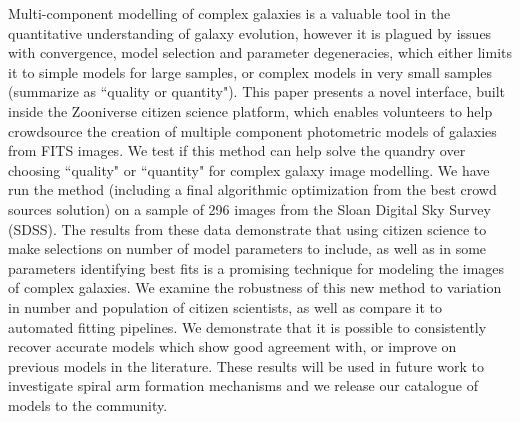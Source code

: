 \documentclass[../main.tex]{subfiles}
\begin{document}
Multi-component modelling of complex galaxies is a valuable tool in the quantitative understanding of galaxy evolution, however it is plagued by issues with convergence, model selection and parameter degeneracies, which either limits it to simple models for large samples, or complex models in very small samples (summarize as ``quality or quantity"). This paper presents a novel interface, built inside the Zooniverse citizen science platform, which enables volunteers to help crowdsource the creation of multiple component photometric models of galaxies from FITS images. We test if this method can help solve the quandry over choosing ``quality" or ``quantity" for complex galaxy image modelling. %
We have run the method (including a final algorithmic optimization from the best crowd sources solution) on a sample of 296 images from the Sloan Digital Sky Survey (SDSS). The results from these data demonstrate that using citizen science to make selections on number of model parameters to include, as well as in some parameters identifying best fits is a promising technique for modeling the images of complex galaxies. We examine the robustness of this new method to variation in number and population of citizen scientists, as well as compare it to automated fitting pipelines. We demonstrate that it is possible to consistently recover accurate models which show good agreement with, or improve on previous models in the literature. These results will be used in future work to investigate spiral arm formation mechanisms and we release our catalogue of models to the community.
\end{document}
